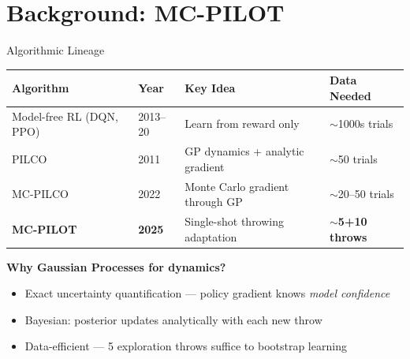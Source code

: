 \documentclass{if-beamer}
\begin{document}
\section{Background: MC-PILOT}

\begin{frame}{Algorithmic Lineage}
    \begin{center}
    \small
    \begin{tabular}{llll}
        \toprule
        \textbf{Algorithm} & \textbf{Year} & \textbf{Key Idea} & \textbf{Data Needed} \\
        \midrule
        Model-free RL (DQN, PPO) & 2013--20 & Learn from reward only & $\sim$1000s trials \\
        PILCO & 2011 & GP dynamics + analytic gradient & $\sim$50 trials \\
        MC-PILCO & 2022 & Monte Carlo gradient through GP & $\sim$20--50 trials \\
        \textbf{MC-PILOT} & \textbf{2025} & Single-shot throwing adaptation & $\mathbf{\sim}$\textbf{5+10 throws} \\
        \bottomrule
    \end{tabular}
    \end{center}
    \vspace{0.5em}
    \textbf{Why Gaussian Processes for dynamics?}
    \begin{itemize}
        \item Exact uncertainty quantification --- policy gradient knows \textit{model confidence}
        \item Bayesian: posterior updates analytically with each new throw
        \item Data-efficient --- 5 exploration throws suffice to bootstrap learning
    \end{itemize}
\end{frame}
\end{document}
